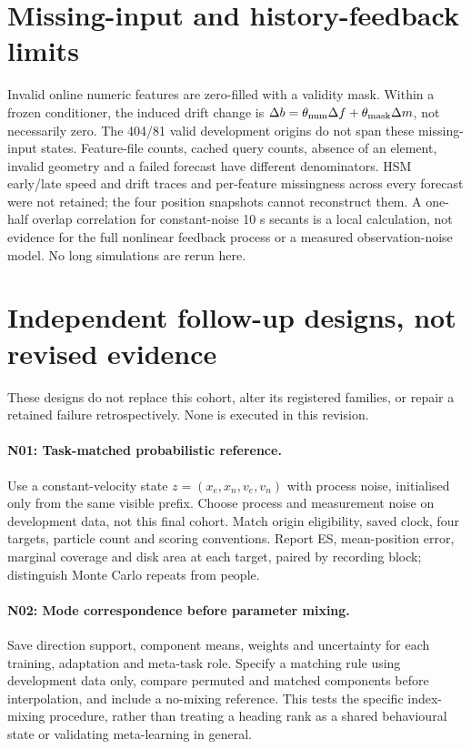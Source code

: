 \section{Missing-input and history-feedback limits}
Invalid online numeric features are zero-filled with a validity mask.
Within a frozen conditioner, the induced drift change is
$\Delta b=\theta_{\rm num}\Delta f+\theta_{\rm mask}\Delta m$, not necessarily zero.
The 404/81 valid development origins do not span these missing-input states.
Feature-file counts, cached query counts, absence of an element, invalid
geometry and a failed forecast have different denominators. HSM early/late
speed and drift traces and per-feature missingness across every forecast
were not retained; the four position snapshots cannot reconstruct them.
A one-half overlap correlation for constant-noise 10 s secants is a local
calculation, not evidence for the full nonlinear feedback process or a
measured observation-noise model. No long simulations are rerun here.

\section{Independent follow-up designs, not revised evidence}\label{sec:follow-up-designs}\hypertarget{sec:follow-up-designs}{}
These designs do not replace this cohort, alter its registered families, or
repair a retained failure retrospectively. None is executed in this revision.
\paragraph{N01: Task-matched probabilistic reference.}
Use a constant-velocity state $z=(x_e,x_n,v_e,v_n)$ with process noise,
initialised only from the same visible prefix. Choose process and measurement
noise on development data, not this final cohort. Match origin eligibility,
saved clock, four targets, particle count and scoring conventions. Report
ES, mean-position error, marginal coverage and disk area at each target,
paired by recording block; distinguish Monte Carlo repeats from people.
\paragraph{N02: Mode correspondence before parameter mixing.}
Save direction support, component means, weights and uncertainty for each
training, adaptation and meta-task role. Specify a matching rule using
development data only, compare permuted and matched components before
interpolation, and include a no-mixing reference. This tests the specific
index-mixing procedure, rather than treating a heading rank as a shared
behavioural state or validating meta-learning in general.
